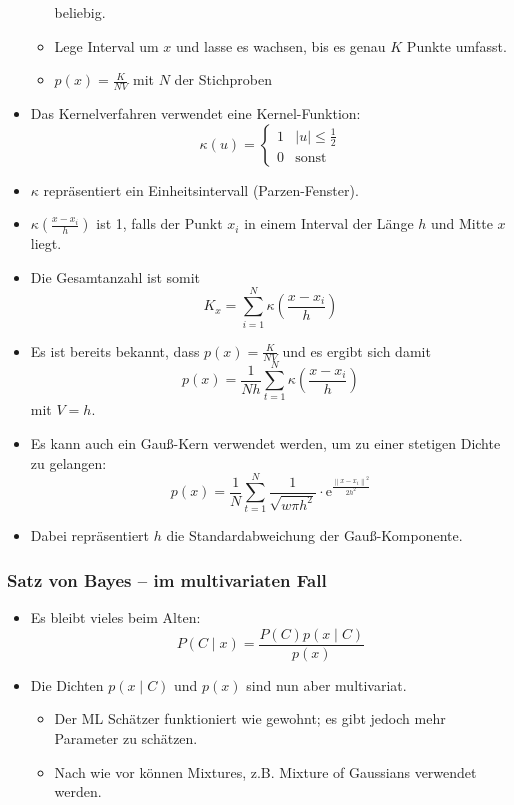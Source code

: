 \documentclass{scrartcl}
\newcommand{\norm}[1]{\left\lVert#1\right\rVert}
\begin{document}
\begin{itemize}
\begin{itemize}
		beliebig.
		\item Lege Interval um $ x $ und lasse es wachsen, bis es genau $ K $ 
		Punkte umfasst.
		\item $ p(x) = \frac{K}{NV} $ mit $ N $ der Stichproben
	\end{itemize}
	\item Das Kernelverfahren verwendet eine Kernel-Funktion:
	\[ \kappa(u) = \begin{cases}
		1 & |u| \leq \frac{1}{2} \\
		0 & \text{sonst}
	\end{cases} \]
	\item $ \kappa $ repräsentiert ein Einheitsintervall (Parzen-Fenster).
	\item $ \kappa(\frac{x - x_i}{h}) $ ist 1, falls der Punkt $ x_i $ in einem 
	Interval der Länge $ h $ und Mitte $ x $ liegt.
	\item Die Gesamtanzahl ist somit
	\[ K_x = \sum_{i=1}^{N} \kappa (\frac{x - x_i}{h}) \]
	\item Es ist bereits bekannt, dass $ p(x) = \frac{K}{NV} $ und es ergibt 
	sich damit
	\[ p(x) = \frac{1}{Nh} \sum_{t=1}^{N} \kappa (\frac{x - x_i}{h}) \]
	mit $ V=h $.
	\item Es kann auch ein Gauß-Kern verwendet werden, um zu einer stetigen 
	Dichte zu gelangen:
	\[ p(x) = \frac{1}{N} \sum_{t=1}^{N} \frac{1}{\sqrt{w \pi h^2}} \cdot
	\mathrm{e}^{\frac{\norm{x-x_i}^2}{2h^2}} \]
	\item Dabei repräsentiert $ h $ die Standardabweichung der Gauß-Komponente.
\end{itemize}

\subsubsection{Satz von Bayes – im multivariaten Fall}

\begin{itemize}
	\item Es bleibt vieles beim Alten:
	\[ P(C \mid x) = \frac{P(C) p(x \mid C)}{p(x)} \]
	\item Die Dichten $ p(x \mid C) $ und $ p(x) $ sind nun aber multivariat.
	\begin{itemize}
		\item Der ML Schätzer funktioniert wie gewohnt; es gibt jedoch mehr 
		Parameter zu schätzen.
		\item Nach wie vor können Mixtures, z.B. Mixture of Gaussians verwendet 
		werden.
	\end{itemize}
\end{itemize}
\end{document}
